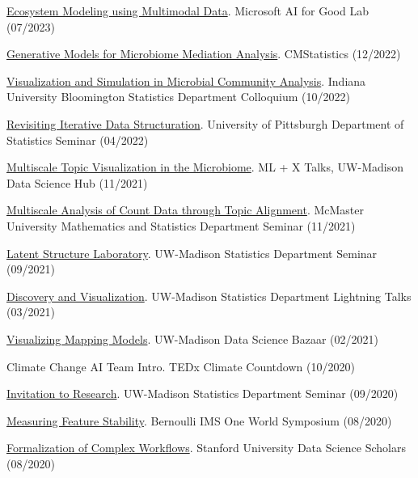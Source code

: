 \documentclass[letterpaper]{article}
\renewenvironment{itemize}{
  \begin{list}{}{
    \setlength{\leftmargin}{1.5em}
  }
}{
  \end{list}
}
\begin{document}
\begin{itemize}
  \item \href{https://krisrs1128.github.io/talks/2023/20230705/20230705.html}{Ecosystem Modeling using Multimodal Data}. Microsoft AI for Good Lab (07/2023)
  \item \href{https://krisrs1128.github.io/talks/2022/20221217/20221217.html}{Generative Models for Microbiome Mediation Analysis}. CMStatistics (12/2022)
  \item \href{https://krisrs1128.github.io/talks/2022/20221021/20221021.html}{Visualization and Simulation in Microbial Community Analysis}. Indiana University Bloomington Statistics Department Colloquium (10/2022)
  \item \href{https://drive.google.com/file/d/1ju9f8e8aRb5OYLE28Ub0Pc6i2KCpcjgN/view?usp=sharing}{Revisiting Iterative Data Structuration}. University of Pittsburgh Department of Statistics Seminar (04/2022)
  \item \href{https://drive.google.com/file/d/14Lwhvd28sGEMSpw3AXZUsg8XXL25Gr4J/view?usp=sharing}{Multiscale Topic Visualization in the Microbiome}. ML + X Talks, UW-Madison Data Science Hub (11/2021)
  \item \href{https://drive.google.com/file/d/1vcs_aLp6gZFixenGscrj6C5koEltxvGa/view?usp=sharing}{Multiscale Analysis of Count Data through Topic Alignment}. McMaster University Mathematics and Statistics Department Seminar (11/2021)
  \item \href{https://drive.google.com/file/d/1xwYyGc1bx7W-F5QyQlB3OJZT7MVTpdYd/view?usp=sharing}{Latent Structure Laboratory}. UW-Madison Statistics Department Seminar (09/2021)
  \item \href{https://drive.google.com/drive/folders/16P8ZeKM1IEZFgCHgSxakUymamMZkNkTl}{Discovery and Visualization}. UW-Madison Statistics Department Lightning Talks (03/2021)
  \item \href{https://krisrs1128.github.io/mapping-vis/}{Visualizing Mapping Models}. UW-Madison Data Science Bazaar (02/2021)
  \item Climate Change AI Team Intro. TEDx Climate Countdown (10/2020)
  \item \href{https://drive.google.com/file/d/1xwYyGc1bx7W-F5QyQlB3OJZT7MVTpdYd/view?usp=sharing}{Invitation to Research}. UW-Madison Statistics Department Seminar (09/2020)
  \item \href{https://www.youtube.com/watch?v=0W84gxCm83A}{Measuring Feature Stability}. Bernoulli IMS One World Symposium (08/2020)
  \item \href{https://drive.google.com/file/d/1mSRbA96aTuiIHSUmgfZKV788seF3X7p_/view?usp=sharing}{Formalization of Complex Workflows}. Stanford University Data Science Scholars (08/2020)

\end{itemize}
\end{document}
